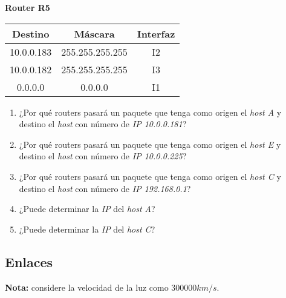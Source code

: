 \documentclass[12pt]{article}
\begin{document}
\textbf{Router R5}

\begin{tabular}{|c|c|c|}
    \hline
    Destino & Máscara & Interfaz \\
    \hline
    10.0.0.183 & 255.255.255.255 & I2 \\
    \hline
    10.0.0.182 & 255.255.255.255 & I3 \\
    \hline
    0.0.0.0 & 0.0.0.0 & I1 \\
    \hline
\end{tabular}

\begin{enumerate}

    \item ¿Por qué routers pasará un paquete que tenga como origen el
        \emph{host A} y destino el \emph{host} con número de \emph{IP
        10.0.0.181}?

    \item ¿Por qué routers pasará un paquete que tenga como origen el
        \emph{host E} y destino el \emph{host} con número de \emph{IP
        10.0.0.225}?

    \item ¿Por qué routers pasará un paquete que tenga como origen el
        \emph{host C} y destino el \emph{host} con número de \emph{IP
        192.168.0.1}?

    \item ¿Puede determinar la \emph{IP} del \emph{host A}?

    \item ¿Puede determinar la \emph{IP} del \emph{host C}?

\end{enumerate}

\subsection*{Enlaces}

\textbf{Nota:} considere la velocidad de la luz como $300000 km/s$.
\end{document}
